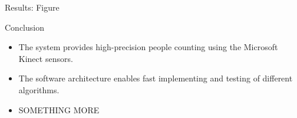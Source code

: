 \documentclass[final,hyperref={pdfpagelabels=false}]{beamer}
\begin{document}
\begin{frame}[t]
\begin{columns}[t]
\begin{column}{.465\textwidth}
\begin{block}{Results: Figure}
\end{block}


\begin{block}{Conclusion}

\begin{itemize}
\item The system provides high-precision people counting using the Microsoft Kinect sensors.
\item The software architecture enables fast implementing and testing of different algorithms.
\item SOMETHING MORE
\end{itemize}

\end{block}

%
%        
%
%
%
%
%


%
%
%


\end{column}
\end{columns}
\end{frame}
\end{document}
